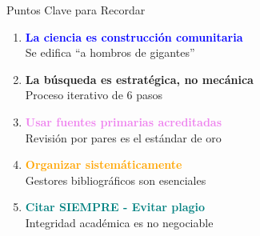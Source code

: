\documentclass[11pt,aspectratio=169]{beamer}
\begin{document}
\begin{frame}{Puntos Clave para Recordar}
	\large
	\begin{enumerate}[label=\arabic*.]
		\item \textcolor{blue}{\textbf{La ciencia es construcción comunitaria}} \\
		      Se edifica ``a hombros de gigantes''

		      \vspace{0.4cm}

		\item \textcolor{green!80!black}{\textbf{La búsqueda es estratégica, no mecánica}} \\
		      Proceso iterativo de 6 pasos

		      \vspace{0.4cm}

		\item \textcolor{violet}{\textbf{Usar fuentes primarias acreditadas}} \\
		      Revisión por pares es el estándar de oro

		      \vspace{0.4cm}

		\item \textcolor{orange}{\textbf{Organizar sistemáticamente}} \\
		      Gestores bibliográficos son esenciales

		      \vspace{0.4cm}

		\item \textcolor{teal}{\textbf{Citar SIEMPRE - Evitar plagio}} \\
		      Integridad académica es no negociable
	\end{enumerate}
\end{frame}

\end{document}
